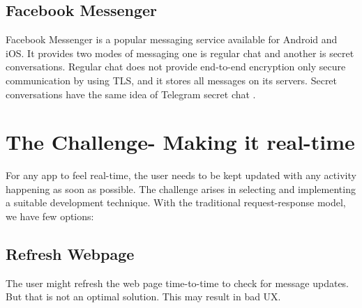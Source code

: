 \subsection{Facebook Messenger}
Facebook Messenger is a popular messaging service
available for Android and iOS. It provides two modes of
messaging one is regular chat and another is secret conversations.
Regular chat does not provide end-to-end encryption only
secure communication by using TLS,  and it stores all
messages on its servers. Secret conversations have  the
same idea of Telegram secret chat . \cite{Sabah2017}

\section{The Challenge- Making it real-time}
For any app to feel real-time, the user needs to be kept updated with any activity happening as soon as possible. The challenge arises in selecting and implementing a suitable development technique. With the traditional request-response model, we have few options:
\subsection{Refresh Webpage}
The user might refresh the web page time-to-time to check for message updates. But that is not an optimal solution. This may result in bad UX.


